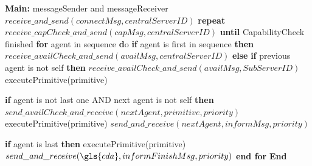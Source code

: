 \begin{algorithm}
    \begin{algorithmic}[1]
   
    \State \textbf{Main:}
     messageSender and messageReceiver
    \State \qquad $receive\_and\_send(connectMsg, centralServerID)$
    \State \textbf{\qquad repeat}
    \State \qquad \qquad $receive\_capCheck\_and\_send(capMsg, centralServerID)$
    \State \textbf{\qquad until} CapabilityCheck finished  
    \State \textbf{\qquad for} agent in sequence {\textbf do}
    \State \textbf{\qquad \qquad if} {agent is first in sequence} \textbf{then}
        \State {\qquad \qquad \qquad} $receive\_availCheck\_and\_send(availMsg, centralServerID)$
        \State \textbf{\qquad \qquad else}
        \State \textbf{\qquad \qquad \qquad if} {previous agent is not self} \textbf{then}
            \State \qquad \qquad \qquad \qquad $receive\_availCheck\_and\_send(availMsg, SubServerID)$
            \State \qquad \qquad \qquad \qquad executePrimitive(primitive)
        
            \State \textbf{\qquad \qquad \qquad if} {agent is not last one AND next agent is not self} \textbf{then}
            \State \textbf{\qquad \qquad \qquad \qquad} $send\_availCheck\_and\_receive(nextAgent, primitive, priority)$
            \State \textbf{\qquad \qquad \qquad \qquad} executePrimitive(primitive)
            \State \textbf{\qquad \qquad \qquad \qquad} $send\_and\_receive(nextAgent, informMsg, priority)$
         
            \State \textbf{\qquad \qquad \qquad if} {agent is last} \textbf{then}
            \State \textbf{\qquad \qquad \qquad \qquad} executePrimitive(primitive)
            \State \textbf{\qquad \qquad \qquad \qquad} $send\_and\_receive(\gls{cda}, informFinishMsg, priority)$
            \State \textbf{\qquad end for} 
    \State \textbf{End} 
\end{algorithmic}
\end{algorithm}


